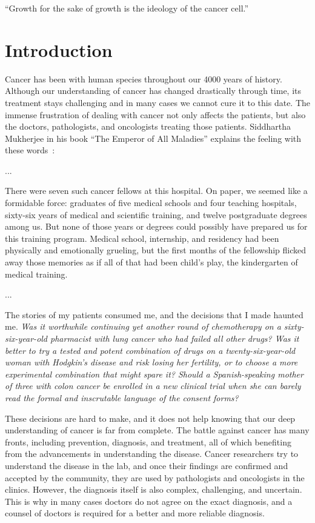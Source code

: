 
\begin{savequote}[.5\linewidth]
  ``Growth for the sake of growth is the ideology of the cancer cell.''
\end{savequote}
\chapter{Introduction}
\label{ch:intro}
Cancer has been with human species throughout our 4000 years of history. Although our understanding of cancer has changed drastically through time, its treatment stays challenging and in many cases we cannot cure it to this date. The immense frustration of dealing with cancer not only affects the patients, but also the doctors, pathologists, and oncologists treating those patients. Siddhartha Mukherjee in his book ``The Emperor of All Maladies'' explains the feeling with these words~\cite[prologue]{the-emperor-of-all-maladies}:

\begin{displayquote}
  ...
  
  There were seven such cancer fellows at this hospital. On paper, we seemed like a formidable force: graduates of five medical schools and four teaching hospitals, sixty-six years of medical and scientific training, and twelve postgraduate degrees among us. But none of those years or degrees could possibly have prepared us for this training program. Medical school, internship, and residency had been physically and emotionally grueling, but the first months of the fellowship flicked away those memories as if all of that had been child's play, the kindergarten of medical training.

  ...

  The stories of my patients consumed me, and the decisions that I made haunted me. \emph{Was it worthwhile continuing yet another round of chemotherapy on a sixty-six-year-old pharmacist with lung cancer who had failed all other drugs? Was it better to try a tested and potent combination of drugs on a twenty-six-year-old woman with Hodgkin's disease and risk losing her fertility, or to choose a more experimental combination that might spare it? Should a Spanish-speaking mother of three with colon cancer be enrolled in a new clinical trial when she can barely read the formal and inscrutable language of the consent forms?}
\end{displayquote}

These decisions are hard to make, and it does not help knowing that our deep understanding of cancer is far from complete. The battle against cancer has many fronts, including prevention, diagnosis, and treatment, all of which benefiting from the advancements in understanding the disease. Cancer researchers try to understand the disease in the lab, and once their findings are confirmed and accepted by the community, they are used by pathologists and oncologists in the clinics. However, the diagnosis itself is also complex, challenging, and uncertain. This is why in many cases doctors do not agree on the exact diagnosis, and a counsel of doctors is required for a better and more reliable diagnosis.

